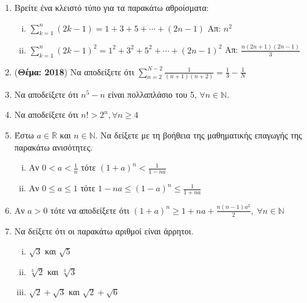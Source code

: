 \begin{enumerate}
    \item \label{ask:sums} Βρείτε ένα κλειστό τύπο για τα παρακάτω 
        αθροίσματα: 
        \begin{enumerate}[i)]
            \item $ \sum_{k=1}^{n} (2k-1) = 1 + 3 + 5 + \cdots + (2n-1)  
                $ \hfill Απ: $ n^{2} $ 

            \item $ \sum_{k=1}^{n} (2k-1)^{2} = 1^{2} + 3^{2} + 5^{2} + \cdots 
                + (2n-1)^{2}  $ \hfill Απ: $ \frac{n(2n+1)(2n-1)}{3} $ 
        \end{enumerate}

    \item \label{ask:thema18sum} ({\bfseries Θέμα: 2018}) Να αποδείξετε ότι $ \sum_{n=2}^{N-2} 
        \frac{1}{(n+1)(n+2)} = \frac{1}{3} - \frac{1}{N} $


    \item Να αποδείξετε ότι $ n^{5} - n $ είναι πολλαπλάσιο του 5,
        $ \forall n \in \mathbb{N} $.

    \item Να αποδείξετε ότι $ n! > 2^{n}, \forall n \geq 4 $

        \pagebreak

    \item Έστω $ a \in \mathbb{R} $ και $ n \in \mathbb{N} $. Να δείξετε
        με τη βοήθεια της μαθηματικής επαγωγής της παρακάτω ανισότητες.

        \begin{enumerate}[i)]
            \item Αν $ 0<a< \frac{1}{n} $ τότε $ (1+a)^{n} < \frac{1}{1-na} $
            \item Αν $ 0 \leq a \leq 1$  τότε $ 1-na \leq (1-a)^{n} \leq
                \frac{1}{1+na} $
        \end{enumerate}

    \item Αν $a > 0$ τότε να αποδείξετε ότι $ (1+a)^{n} \geq 1 + na + 
        \frac{n(n-1)a^{2}}{2},\; \forall n \in \mathbb{N}   $ 


    \item Να δείξετε ότι οι παρακάτω αριθμοί είναι άρρητοι.
        \begin{enumerate}[i)]
            \item $ \sqrt{3} $ και  $ \sqrt{5} $
            \item $ \sqrt[3]{2} $ και $ \sqrt[3]{3} $
            \item $ \sqrt{2} + \sqrt{3} $ και $ \sqrt{2} + \sqrt{6} $ 
        \end{enumerate}

\end{enumerate}

